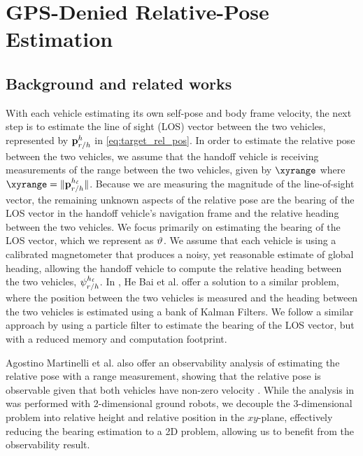 \chapter{GPS-Denied Relative-Pose Estimation}
\label{ch:relative_pose} 

\section{Background and related works}
With each vehicle estimating its own self-pose and body frame velocity, the next step is to estimate the line of sight (LOS) vector between the two vehicles, represented by ${\mathbf{p}}_{r/h}^{h}$ in \eqref{eq:target_rel_pos}. 
In order to estimate the relative pose between the two vehicles, we assume that the handoff vehicle is receiving measurements of the range between the two vehicles, given by $\xyrange$ where $\xyrange = \norm{\losxy}$.
Because we are measuring the magnitude of the line-of-sight vector, the remaining unknown aspects of the relative pose are the bearing of the LOS vector in the handoff vehicle's navigation frame and the relative heading between the two vehicles. 
We focus primarily on estimating the bearing of the LOS vector, which we represent as ${{\vartheta}}$. 
We assume that each vehicle is using a calibrated magnetometer that produces a noisy, yet reasonable estimate of global heading, allowing the handoff vehicle to compute the relative heading between the two vehicles, ${{\psi}_{r/h}^{h_\ell}}$.
In \cite{BaiBeard16}, He Bai et al. offer a solution to a similar problem, where the position between the two vehicles is measured and the heading between the two vehicles is estimated using a bank of Kalman Filters. 
We follow a similar approach by using a particle filter to estimate the bearing of the LOS vector, but with a reduced memory and computation footprint.

Agostino Martinelli et al. also offer an observability analysis of estimating the relative pose with a range measurement, showing that the relative pose is observable given that both vehicles have non-zero velocity \cite{MartinelliSiegward05}. 
While the analysis in \cite{MartinelliSiegward05} was performed with 2-dimensional ground robots, we decouple the 3-dimensional problem into relative height and relative position in the $xy$-plane, effectively reducing the bearing estimation to a 2D problem, allowing us to benefit from the observability result. 

